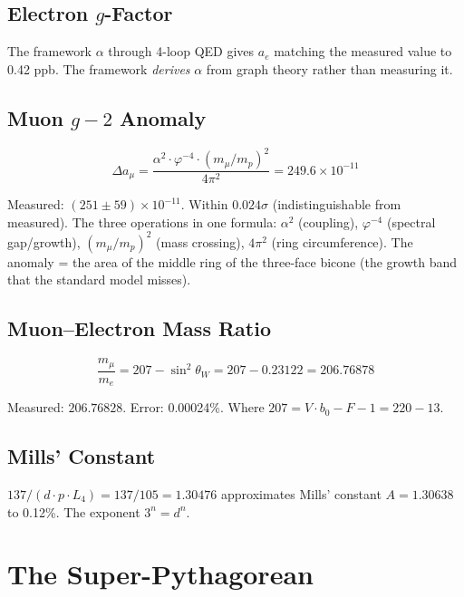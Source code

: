 \documentclass[12pt,a4paper]{article}
\begin{document}
\subsection{Electron $g$-Factor}

The framework $\alpha$ through 4-loop QED gives $a_e$ matching the measured value to 0.42 ppb. The framework \emph{derives} $\alpha$ from graph theory rather than measuring it.

\subsection{Muon $g-2$ Anomaly}

\begin{equation}
\Delta a_\mu = \frac{\alpha^2 \cdot \varphi^{-4} \cdot (m_\mu/m_p)^2}{4\pi^2} = 249.6 \times 10^{-11}
\end{equation}

Measured: $(251 \pm 59) \times 10^{-11}$. Within $0.024\sigma$ (indistinguishable from measured). The three operations in one formula: $\alpha^2$ (coupling), $\varphi^{-4}$ (spectral gap/growth), $(m_\mu/m_p)^2$ (mass crossing), $4\pi^2$ (ring circumference). The anomaly = the area of the middle ring of the three-face bicone (the growth band that the standard model misses).

\subsection{Muon--Electron Mass Ratio}

\begin{equation}
\frac{m_\mu}{m_e} = 207 - \sin^2\theta_W = 207 - 0.23122 = 206.76878
\end{equation}

Measured: $206.76828$. Error: 0.00024\%. Where $207 = V \cdot b_0 - F - 1 = 220 - 13$.

\subsection{Mills' Constant}

$137/(d \cdot p \cdot L_4) = 137/105 = 1.30476$ approximates Mills' constant $A = 1.30638$ to 0.12\%. The exponent $3^n = d^n$.

\section{The Super-Pythagorean}
\end{document}
